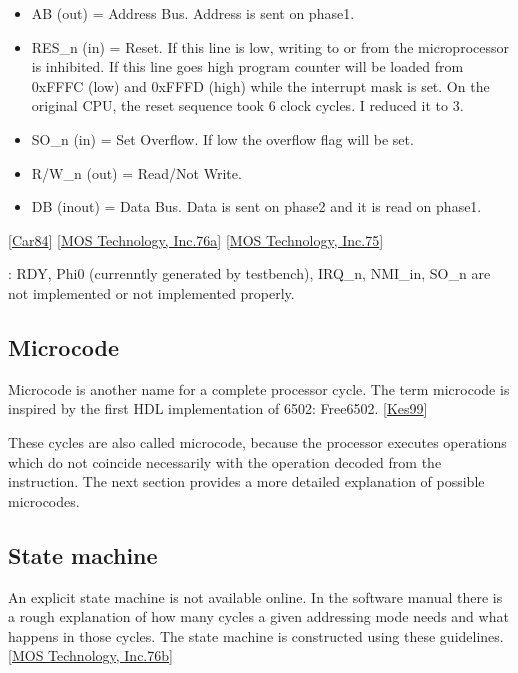\documentclass[letterpaper,10pt,english]{sphinxmanual}
\begin{document}
\begin{itemize}
\item {} 
\sphinxAtStartPar
AB (out) = Address Bus. Address is sent on phase\sphinxhyphen{}1.

\item {} 
\sphinxAtStartPar
RES\_n (in) = Reset. If this line is low, writing to or from the microprocessor
is inhibited. If this line goes high program counter will be loaded from
0xFFFC (low) and 0xFFFD (high) while the interrupt mask is set. On the
original CPU, the reset sequence took 6 clock cycles. I reduced it to 3.

\item {} 
\sphinxAtStartPar
SO\_n (in) = Set Overflow. If low the overflow flag will be set.

\item {} 
\sphinxAtStartPar
R/W\_n (out) = Read/Not Write.

\item {} 
\sphinxAtStartPar
DB (inout) = Data Bus. Data is sent on phase\sphinxhyphen{}2 and it is read on phase\sphinxhyphen{}1.

\end{itemize}

\sphinxAtStartPar
{[}\hyperlink{cite.index:id11}{Car84}{]} {[}\hyperlink{cite.index:id14}{MOS Technology, Inc.76a}{]} {[}\hyperlink{cite.index:id13}{MOS Technology, Inc.75}{]}

\sphinxAtStartPar
{}: RDY, Phi0 (currenntly generated by testbench), IRQ\_n,
NMI\_in, SO\_n are not implemented or not implemented properly.


\subsection{Microcode}
\label{\detokenize{core_6502:microcode}}\label{\detokenize{core_6502:id9}}
\sphinxAtStartPar
Microcode is another name for a complete processor cycle. The term microcode is
inspired by the first HDL implementation of 6502: Free\sphinxhyphen{}6502. {[}\hyperlink{cite.index:id7}{Kes99}{]}

\sphinxAtStartPar
These cycles are also called microcode, because the processor executes
operations which do not coincide necessarily with the operation decoded from the
instruction. The next section provides a more detailed explanation of possible
microcodes.


\subsection{State machine}
\label{\detokenize{core_6502:state-machine}}\label{\detokenize{core_6502:sm}}
\sphinxAtStartPar
An explicit state machine is not available online. In the software manual there
is a rough explanation of how many cycles a given addressing mode needs and what
happens in those cycles. The state machine is constructed using these
guidelines. {[}\hyperlink{cite.index:id15}{MOS Technology, Inc.76b}{]}
\end{document}
